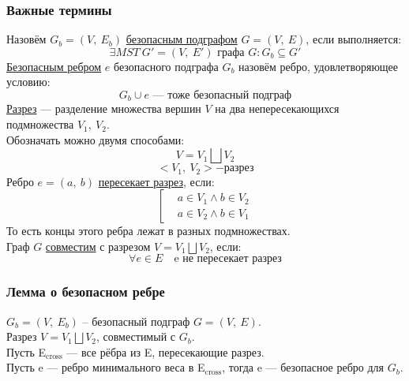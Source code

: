 \documentclass[12pt, a4paper]{article}
\begin{document}
    \subsubsection*{Важные термины}
    Назовём $G_b = (V,\ E_b)$ \underline{безопасным подграфом} $G = (V,\ E)$, если выполняется:
    \[\exists MST\ G' = (V,\ E')\text{ графа } G: G_b\subseteq G'\]
    \underline{Безопасным ребром} $e$ безопасного подграфа $G_b$ назовём ребро, удовлетворяющее условию:
    \[G_b \cup e \text{ --- тоже безопасный подграф}\]
    \underline{Разрез} --- разделение множества вершин $V$ на два непересекающихся подмножества $V_1,\ V_2$.\\
    Обозначать можно двумя способами:
    \[V=  V_1 \bigsqcup V_2\]
    \[<V_1,\ V_2> - \text{разрез}\]
    Ребро $e = (a,\ b)$ \underline{пересекает разрез}, если:
    \[\left[ \begin{aligned}
        &a\in V_1 \wedge b\in V_2\\
        &a\in V_2 \wedge b\in V_1
    \end{aligned} \right.\]
    То есть концы этого ребра лежат в разных подмножествах.\\
    Граф $G$ \underline{совместим} с разрезом $V = V_1\bigsqcup V_2$, если:
    \[\forall e\in E\quad \text{e не пересекает разрез}\]
    \subsubsection{Лемма о безопасном ребре}
    $G_b = (V,\ E_{b})$ -- безопасный подграф $G = (V,\ E)$.\\
    Разрез $V = V_1\bigsqcup V_2$, совместимый с $G_b$.\\
    Пусть E$_{\text{cross}}$ --- все рёбра из E, пересекающие разрез.\\
    Пусть e --- ребро {минимального веса} в E$_{\text{cross}}$, тогда e --- безопасное ребро для $G_b$.
\end{document}
